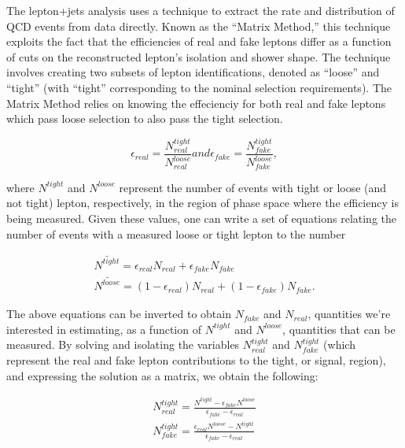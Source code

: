 The lepton+jets analysis uses a technique to extract the rate and distribution of QCD events from data directly.
Known as the ``Matrix Method,'' this technique exploits the fact that the efficiencies of real and fake leptons differ as a function of cuts on the reconstructed lepton's isolation and shower shape.
The technique involves creating two subsets of lepton identifications, denoted as ``loose'' and ``tight'' (with ``tight'' corresponding to the nominal selection requirements).
The Matrix Method relies on knowing the effecienciy for both real and fake leptons which pass loose selection to also pass the tight selection.

\begin{equation}
  \epsilon_{real} = \frac{N^{tight}_{real}}{N^{loose}_{real}} and \epsilon_{fake} = \frac{N^{tight}_{fake}}{N^{loose}_{fake}},
\end{equation}

where $N^{tight}$ and $N^{loose}$ represent the number of events with tight or loose (and not tight) lepton, respectively, in the region of phase space where the efficiency is being measured.
Given these values, one can write a set of equations relating the number of events with a measured loose or tight lepton to the number  

\begin{eqnarray}
  \bar{N^{tight}} = \epsilon_{real} N_{real} + \epsilon_{fake} N_{fake} \\
  \bar{N^{loose}} = (1-\epsilon_{real}) N_{real} + (1-\epsilon_{fake}) N_{fake}.
  \label{eq:MatrixMethod}
\end{eqnarray}

The above equations can be inverted to obtain $N_{fake}$ and $N_{real}$, quantities we're interested in estimating, as a function of  $N^{tight}$ and $N^{loose}$, quantities that can be measured.
By solving and isolating the variables $N^{tight}_{real}$ and $N^{tight}_{fake}$ (which represent the real and fake lepton contributions to the tight, or signal, region), and expressing the solution as a matrix, we obtain the following:

\begin{eqnarray}
  N^{tight}_{real} = \frac{N^{tight} - \epsilon_{fake}N^{loose}}{\epsilon_{fake} - \epsilon_{real}} \\
  N^{tight}_{fake} = \frac{\epsilon_{real}N^{loose} - N^{tight}}{\epsilon_{fake} - \epsilon_{real}}
\end{eqnarray}

